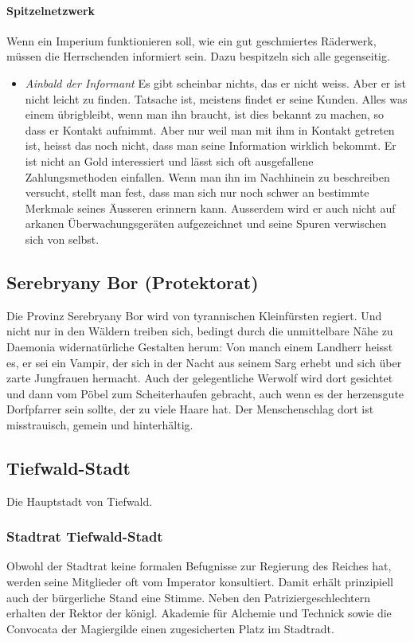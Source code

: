 \documentclass[10pt,twoside,twocolumn,openany]{book}
\begin{document}
\paragraph{Spitzelnetzwerk} Wenn ein Imperium funktionieren soll, wie ein gut geschmiertes Räderwerk, müssen die Herrschenden informiert sein. Dazu bespitzeln sich alle gegenseitig.
\begin{itemize}
	\item\textit{Ainbald der Informant} Es gibt scheinbar nichts, das er nicht weiss. Aber er ist nicht leicht zu finden. Tatsache ist, meistens findet er seine Kunden. Alles was einem übrigbleibt, wenn man ihn braucht, ist dies bekannt zu machen, so dass er Kontakt aufnimmt. Aber nur weil man mit ihm in Kontakt getreten ist, heisst das noch nicht, dass man seine Information wirklich bekommt. Er ist nicht an Gold interessiert und lässt sich oft ausgefallene Zahlungsmethoden einfallen.
	Wenn man ihn im Nachhinein zu beschreiben versucht, stellt man fest, dass man sich nur noch schwer an bestimmte Merkmale seines Äusseren erinnern kann. Ausserdem wird er auch nicht auf arkanen Überwachungsgeräten aufgezeichnet und seine Spuren verwischen sich von selbst.
\end{itemize}

\subsection{Serebryany Bor (Protektorat)}
Die Provinz Serebryany Bor wird von tyrannischen Kleinfürsten regiert. Und nicht nur in den Wäldern treiben sich, bedingt durch die unmittelbare Nähe zu Daemonia widernatürliche Gestalten herum: Von manch einem Landherr heisst es, er sei ein Vampir, der sich in der Nacht aus seinem Sarg erhebt und sich über zarte Jungfrauen hermacht. Auch der gelegentliche Werwolf wird dort gesichtet und dann vom Pöbel zum Scheiterhaufen gebracht, auch wenn es der herzensgute Dorfpfarrer sein sollte, der zu viele Haare hat. Der Menschenschlag dort ist misstrauisch, gemein und hinterhältig.

\subsection{Tiefwald-Stadt}

Die Hauptstadt von Tiefwald.

\subsubsection{Stadtrat Tiefwald-Stadt} Obwohl der Stadtrat keine formalen Befugnisse zur Regierung des Reiches hat, werden seine Mitglieder oft vom Imperator konsultiert. Damit erhält prinzipiell auch der bürgerliche Stand eine Stimme. Neben den Patriziergeschlechtern erhalten der Rektor der königl. Akademie für Alchemie und Technick sowie die Convocata der Magiergilde einen zugesicherten Platz im Stadtradt.
\end{document}
